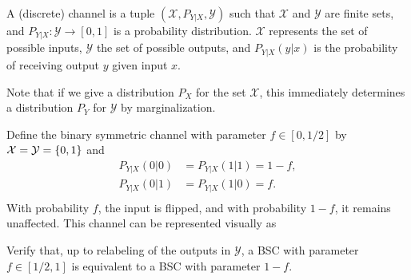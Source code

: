 \begin{definition}
A (discrete) channel is a tuple $(\mathcal{X}, P_{Y|X}, \mathcal{Y})$ such that $\mathcal{X}$ and $\mathcal{Y}$ are finite sets, and $P_{Y|X} : \mathcal{Y} \to [0,1]$ is a probability distribution. $\mathcal{X}$ represents the set of possible inputs, $\mathcal{Y}$ the set of possible outputs, and $P_{Y|X}(y|x)$ is the probability of receiving output $y$ given input $x$.
\end{definition}
Note that if we give a distribution $P_X$ for the set $\mathcal{X}$, this immediately determines a distribution $P_Y$ for $\mathcal{Y}$ by marginalization.

\begin{example}\label{example:binary-symmetric-channel}
Define the binary symmetric channel with parameter $f \in [0,1/2]$ by $\mathcal{X} = \mathcal{Y} = \{0,1\}$ and
\begin{align*}
P_{Y|X}(0|0) &= P_{Y|X}(1|1) = 1-f,\\
P_{Y|X}(0|1) &= P_{Y|X}(1|0) = f.\\
\end{align*}
With probability $f$, the input is flipped, and with probability $1-f$, it remains unaffected. This channel can be represented visually as
\begin{center}
\end{center} 
\end{example}
\begin{exercise}
Verify that, up to relabeling of the outputs in $\mathcal{Y}$, a BSC with parameter $f \in [1/2,1]$ is equivalent to a BSC with parameter $1-f$.
\end{exercise}

